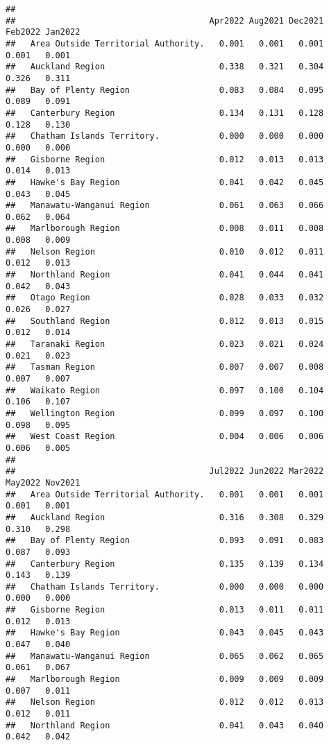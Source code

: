 \documentclass[
  10pt,
]{article}
\begin{document}
\begin{verbatim}
##                                      
##                                       Apr2022 Aug2021 Dec2021 Feb2022 Jan2022
##   Area Outside Territorial Authority.   0.001   0.001   0.001   0.001   0.001
##   Auckland Region                       0.338   0.321   0.304   0.326   0.311
##   Bay of Plenty Region                  0.083   0.084   0.095   0.089   0.091
##   Canterbury Region                     0.134   0.131   0.128   0.128   0.130
##   Chatham Islands Territory.            0.000   0.000   0.000   0.000   0.000
##   Gisborne Region                       0.012   0.013   0.013   0.014   0.013
##   Hawke's Bay Region                    0.041   0.042   0.045   0.043   0.045
##   Manawatu-Wanganui Region              0.061   0.063   0.066   0.062   0.064
##   Marlborough Region                    0.008   0.011   0.008   0.008   0.009
##   Nelson Region                         0.010   0.012   0.011   0.012   0.013
##   Northland Region                      0.041   0.044   0.041   0.042   0.043
##   Otago Region                          0.028   0.033   0.032   0.026   0.027
##   Southland Region                      0.012   0.013   0.015   0.012   0.014
##   Taranaki Region                       0.023   0.021   0.024   0.021   0.023
##   Tasman Region                         0.007   0.007   0.008   0.007   0.007
##   Waikato Region                        0.097   0.100   0.104   0.106   0.107
##   Wellington Region                     0.099   0.097   0.100   0.098   0.095
##   West Coast Region                     0.004   0.006   0.006   0.006   0.005
##                                      
##                                       Jul2022 Jun2022 Mar2022 May2022 Nov2021
##   Area Outside Territorial Authority.   0.001   0.001   0.001   0.001   0.001
##   Auckland Region                       0.316   0.308   0.329   0.310   0.298
##   Bay of Plenty Region                  0.093   0.091   0.083   0.087   0.093
##   Canterbury Region                     0.135   0.139   0.134   0.143   0.139
##   Chatham Islands Territory.            0.000   0.000   0.000   0.000   0.000
##   Gisborne Region                       0.013   0.011   0.011   0.012   0.013
##   Hawke's Bay Region                    0.043   0.045   0.043   0.047   0.040
##   Manawatu-Wanganui Region              0.065   0.062   0.065   0.061   0.067
##   Marlborough Region                    0.009   0.009   0.009   0.007   0.011
##   Nelson Region                         0.012   0.012   0.013   0.012   0.011
##   Northland Region                      0.041   0.043   0.040   0.042   0.042

\end{verbatim}
\end{document}
